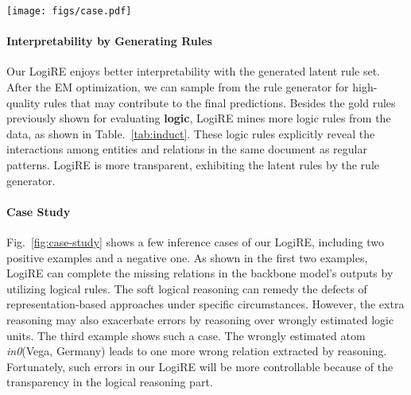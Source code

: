 \documentclass[11pt]{article}
\newcommand{\mymodel}{LogiRE\xspace}
\begin{document}
\begin{figure*}
    \centering
    \texttt{[image: figs/case.pdf]}
    \caption{Inference cases of our \mymodel on DWIE by using ATLOP as the backbone model. The grey arrows are relations extracted by the backbone model, solid lines representing true relations while dashed lines representing false relations. The green arrows are new relations correctly extracted by logical reasoning. The blue arrows indicate the potential reasoning paths. We also demonstrate a negative case. In the third example, the red arrow represents a wrong relation extracted by reasoning over wrongly estimated atoms.}
    \label{fig:case-study}
\end{figure*}

\paragraph{Interpretability by Generating Rules}
Our \mymodel enjoys better interpretability with the generated latent rule set. After the EM optimization, we can sample from the rule generator for high-quality rules that may contribute to the final predictions. Besides the gold rules previously shown for evaluating \textbf{logic}, \mymodel mines more logic rules from the data, as shown in Table.~\ref{tab:induct}. These logic rules explicitly reveal the interactions among entities and relations in the same document as regular patterns. \mymodel is more transparent, exhibiting the latent rules by the rule generator.


\paragraph{Case Study}
Fig.~\ref{fig:case-study} shows a few inference cases of our \mymodel, including two positive examples and a negative one. As shown in the first two examples, \mymodel can complete the missing relations in the backbone model's outputs by utilizing logical rules. 
The soft logical reasoning can remedy the defects of representation-based approaches under specific circumstances. 
However, the extra reasoning may also exacerbate errors by reasoning over wrongly estimated logic units. The third example shows such a case. The wrongly estimated atom \emph{in0}(Vega, Germany) leads to one more wrong relation extracted by reasoning. Fortunately, such errors in our \mymodel will be more controllable because of the transparency in the logical reasoning part.
 
\end{document}
